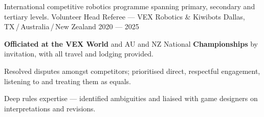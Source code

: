 \cventry%
    {International competitive robotics programme spanning primary, secondary and tertiary levels.}
    {Volunteer Head Referee \textnormal{--- VEX Robotics \& Kiwibots}}
    {Dallas, TX\,/\,Australia\,/\,New Zealand}
    {2020 --- 2025}
    {
      \begin{cvitems}
        \item {\textbf{Officiated at the VEX World} and AU and NZ National \textbf{Championships} by invitation, with all travel and lodging provided.}
        \item {Resolved disputes amongst competitors; prioritised direct, respectful engagement, listening to and treating them as equals.}
        \item {Deep rules expertise --- identified ambiguities and liaised with game designers on interpretations and revisions.}
      \end{cvitems}
    }
